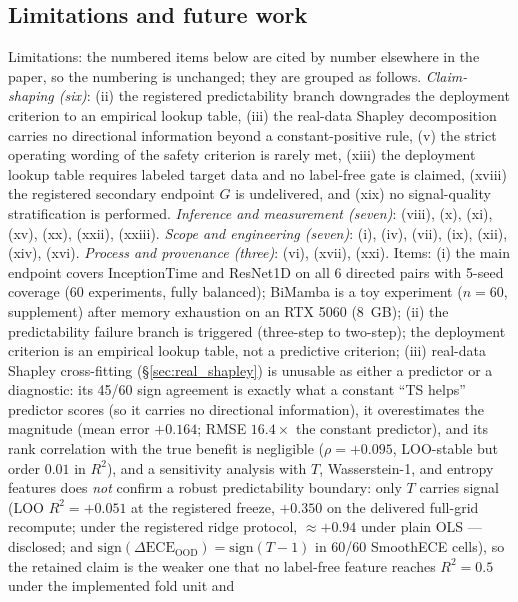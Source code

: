 \documentclass[review,12pt,nonatbib]{elsarticle}
\begin{document}
\subsection{Limitations and future work}
Limitations: the numbered items below are cited by number elsewhere in
the paper, so the numbering is unchanged; they are grouped as follows.
\emph{Claim-shaping (six)}: (ii) the registered predictability branch
downgrades the deployment criterion to an empirical lookup table, (iii)
the real-data Shapley decomposition carries no directional information
beyond a constant-positive rule, (v) the strict operating wording of
the safety criterion is rarely met, (xiii) the deployment lookup table
requires labeled target data and no label-free gate is claimed,
(xviii) the registered secondary endpoint $G$ is undelivered, and (xix)
no signal-quality stratification is performed. \emph{Inference and
measurement (seven)}: (viii), (x), (xi), (xv), (xx), (xxii), (xxiii).
\emph{Scope and engineering (seven)}: (i), (iv), (vii), (ix), (xii),
(xiv), (xvi). \emph{Process and provenance (three)}: (vi), (xvii),
(xxi). Items: (i) the main endpoint covers InceptionTime and
ResNet1D on all 6 directed pairs with 5-seed coverage (60 experiments,
fully balanced); BiMamba is a toy experiment ($n=60$, supplement) after
memory exhaustion on an RTX 5060 (8~GB); (ii) the predictability failure
branch is triggered (three-step to two-step); the deployment criterion
is an empirical lookup table, not a predictive criterion; (iii)
real-data Shapley cross-fitting (\S\ref{sec:real_shapley}) is unusable
as either a predictor or a diagnostic: its 45/60 sign agreement is
exactly what a constant ``TS helps'' predictor scores (so it carries no
directional information), it overestimates the magnitude (mean error
$+0.164$; RMSE $16.4\times$ the constant predictor), and its rank
correlation with the true benefit is negligible
($\rho=+0.095$, LOO-stable but order $0.01$ in $R^2$), and a sensitivity analysis with $T$, Wasserstein-1, and
entropy features does \emph{not} confirm a robust predictability
boundary: only $T$ carries signal (LOO $R^2=+0.051$ at the registered
freeze, $+0.350$ on the delivered full-grid recompute; under the
registered ridge protocol, $\approx+0.94$ under plain OLS ---
disclosed; and
$\mathrm{sign}(\Delta\text{ECE}_{\text{OOD}})=\mathrm{sign}(T-1)$ in
60/60 SmoothECE cells), so the retained claim is the weaker one that no
label-free feature reaches $R^2=0.5$ under the implemented fold unit and
\end{document}
